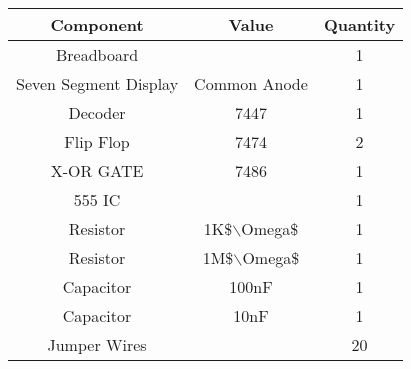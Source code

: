 \begin{tabular}{|c|c|c|}
\hline
Component		&Value	 	&Quantity\\
\hline
Breadboard		&	&1\\
\hline
Seven Segment Display			&Common Anode	&1\\
\hline
Decoder		&7447		&1\\
\hline
Flip Flop	&7474		&2\\
\hline
X-OR GATE		&7486		&1\\
\hline
555 IC	&		&1\\
\hline
Resistor		&1K\$$\backslash$Omega\$	&1\\
\hline
Resistor		&1M\$$\backslash$Omega\$		&1\\
\hline
Capacitor		&100nF		&1\\
\hline
Capacitor		&10nF		&1\\
\hline
Jumper Wires	&			&20\\
\hline
\end{tabular}
